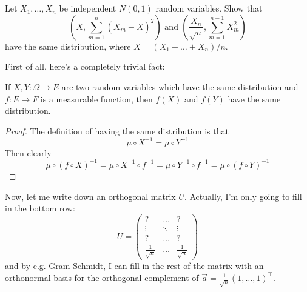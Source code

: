 \documentclass[11pt, headheight=30pt]{scrartcl}
\begin{document}

\section{}
\begin{prob}
    Let $X_1, \dots, X_n$ be independent $N(0, 1)$ random variables.
    Show that
    \[
        \left(\overline{X}, \sum_{m = 1}^n (X_m - \overline{X})^2\right) \text{ and } \left(\frac{X_n}{\sqrt{n}}, \sum_{m=1}^{n-1} X_m^2\right) \tag{$\star$}
    \]
    have the same distribution, where $\overline{X} = (X_1 + \dots + X_n)/n$.
\end{prob}

First of all, here's a completely trivial fact:
\begin{claim*}
    If $X,Y:\Omega\to E$ are two random variables which have the same distribution
    and $f:E\to F$ is a measurable function, then $f(X)$ and $f(Y)$
    have the same distribution.
\end{claim*}
\begin{proof}
    The definition of having the same distribution is that
    \[
        \mu\circ X^{-1} = \mu\circ Y^{-1}
    \]
    Then clearly
    \[
        \mu\circ (f\circ X)^{-1} = \mu\circ X^{-1}\circ f^{-1} = \mu\circ Y^{-1}\circ f^{-1} = \mu\circ (f\circ Y)^{-1}
    \]
\end{proof}


Now, let me write down an orthogonal matrix $U$. Actually, I'm only
going to fill in the bottom row:
\[
    U = \begin{pmatrix}
            ? & \dots & ?\\
            \vdots & \ddots & \vdots\\
            ? & \dots & ?\\
            \frac{1}{\sqrt{n}} & \dots & \frac{1}{\sqrt{n}}
        \end{pmatrix}  
\]
and by e.g. Gram-Schmidt, I can fill in the rest of the matrix
with an orthonormal basis for the orthogonal
complement of $\vec{a} = \frac{1}{\sqrt{n}}(1,\dots, 1)^\top$.
\end{document}
